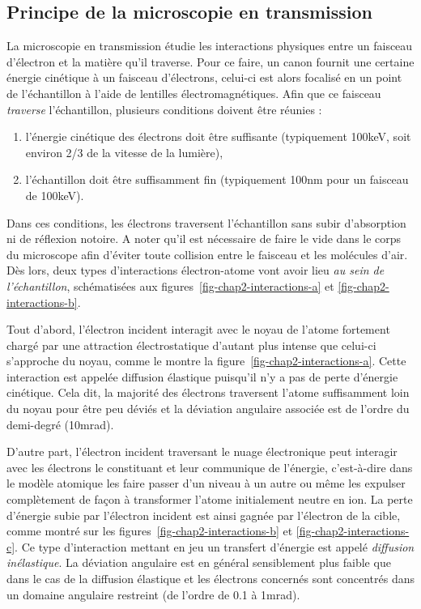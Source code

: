     \subsection{Principe de la microscopie en transmission}\label{subsec-principe-physique-tem}

    La microscopie en transmission étudie les interactions physiques entre un faisceau d'électron et la matière qu'il traverse. Pour ce faire, un canon fournit une certaine énergie cinétique à un faisceau d'électrons, celui-ci est alors focalisé en un point de l'échantillon à l'aide de lentilles électromagnétiques. Afin que ce faisceau \emph{traverse} l'échantillon, plusieurs conditions doivent être réunies :
    \begin{enumerate}[label=(\alph*)]
    	\item l'énergie cinétique des électrons doit être suffisante (typiquement 100keV, soit environ 2/3 de la vitesse de la lumière),
    	\item l'échantillon doit être suffisamment fin (typiquement 100nm pour un faisceau de 100keV).
    \end{enumerate}
    Dans ces conditions, les électrons traversent l'échantillon sans subir d'absorption ni de réflexion notoire. A noter qu'il est nécessaire de faire le vide dans le corps du microscope afin d'éviter toute collision entre le faisceau et les molécules d'air. Dès lors, deux types d'interactions électron-atome vont avoir lieu \emph{au sein de l'échantillon}, schématisées aux figures~\ref{fig-chap2-interactions-a} et \ref{fig-chap2-interactions-b}.

    Tout d'abord, l'électron incident interagit avec le noyau de l'atome fortement chargé par une attraction électrostatique d'autant plus intense que celui-ci s'approche du noyau, comme le montre la figure~\ref{fig-chap2-interactions-a}. Cette interaction est appelée diffusion élastique puisqu'il n'y a pas de perte d'énergie cinétique. Cela dit, la majorité des électrons traversent l'atome suffisamment loin du noyau pour être peu déviés et la déviation angulaire associée est de l'ordre du demi-degré (10\;mrad).
    
    D'autre part, l'électron incident traversant le nuage électronique peut interagir avec les électrons le constituant et leur communique de l'énergie, c'est-à-dire dans le modèle atomique les faire passer d'un niveau à un autre ou même les expulser complètement de façon à transformer l'atome initialement neutre en ion. La perte  d'énergie subie par l'électron incident est ainsi gagnée par l'électron de la cible, comme montré sur les figures~\ref{fig-chap2-interactions-b} et \ref{fig-chap2-interactions-c}. Ce type d'interaction mettant en jeu un transfert d'énergie est appelé \emph{diffusion inélastique}. La déviation angulaire est en général sensiblement plus faible que dans le cas de la diffusion élastique et les électrons concernés sont concentrés dans un domaine angulaire restreint (de l'ordre de 0.1 à 1\;mrad).
    
